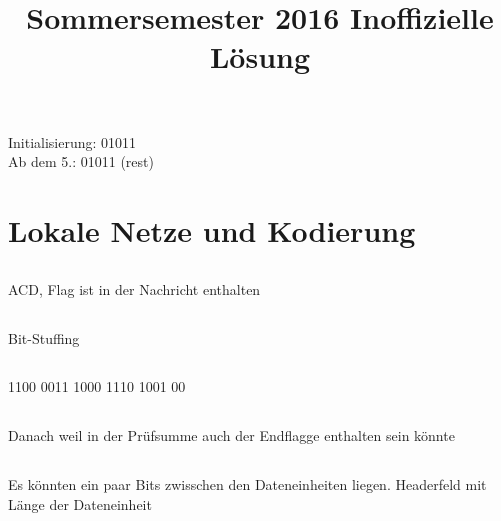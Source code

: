 \documentclass[a4paper]{article}
\title{Sommersemester 2016 Inoffizielle Lösung}
\begin{document}
\section{}
\subsection{}
\subsection{}
\subsection{}
\subsection{}
\subsection{}
Initialisierung: 01011 \\
Ab dem 5.: 01011 (rest)
\section{Lokale Netze und Kodierung}
\subsection{}
ACD, Flag ist in der Nachricht enthalten
\subsection{}
Bit-Stuffing
\subsection{}
1100 0011 1000 1110 1001 00
\subsection{}
Danach weil in der Prüfsumme auch der Endflagge enthalten sein könnte
\subsection{}
Es könnten ein paar Bits zwisschen den Dateneinheiten liegen.
Headerfeld mit Länge der Dateneinheit
\section{}
\end{document}
